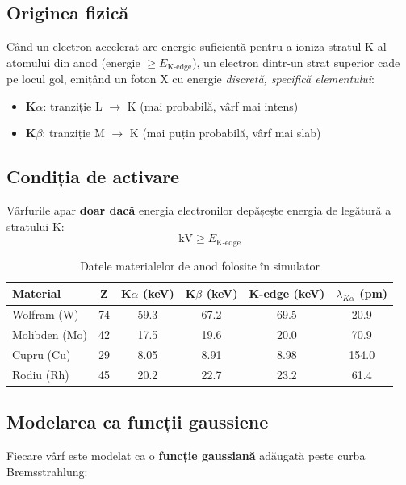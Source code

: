 \documentclass[12pt,a4paper]{article}
\begin{document}
\subsection{Originea fizică}

Când un electron accelerat are energie suficientă pentru a ioniza stratul K al atomului din anod (energie $\geq E_{\text{K-edge}}$), un electron dintr-un strat superior cade pe locul gol, emițând un foton X cu energie \emph{discretă, specifică elementului}:

\begin{itemize}[leftmargin=2em]
    \item \textbf{K$\alpha$}: tranziție L $\to$ K (mai probabilă, vârf mai intens)
    \item \textbf{K$\beta$}: tranziție M $\to$ K (mai puțin probabilă, vârf mai slab)
\end{itemize}

\subsection{Condiția de activare}

Vârfurile apar \textbf{doar dacă} energia electronilor depășește energia de legătură a stratului K:
\[
    \text{kV} \geq E_{\text{K-edge}}
\]

\begin{table}[h]
\centering
\renewcommand{\arraystretch}{1.3}
\begin{tabular}{|l|c|c|c|c|c|}
\hline
\textbf{Material} & \textbf{Z} & \textbf{K$\alpha$ (keV)} & \textbf{K$\beta$ (keV)} & \textbf{K-edge (keV)} & \textbf{$\lambda_{K\alpha}$ (pm)} \\
\hline
Wolfram (W)   & 74 & 59.3 & 67.2 & 69.5 & 20.9 \\
Molibden (Mo) & 42 & 17.5 & 19.6 & 20.0 & 70.9 \\
Cupru (Cu)    & 29 &  8.05 & 8.91 & 8.98 & 154.0 \\
Rodiu (Rh)    & 45 & 20.2 & 22.7 & 23.2 & 61.4 \\
\hline
\end{tabular}
\caption{Datele materialelor de anod folosite în simulator}
\end{table}

\subsection{Modelarea ca funcții gaussiene}

Fiecare vârf este modelat ca o \textbf{funcție gaussiană} adăugată peste curba Bremsstrahlung:
\end{document}
